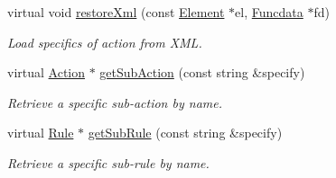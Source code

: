 \begin{DoxyCompactItemize}
virtual void \mbox{\hyperlink{class_action_a80154d5741583712fc63e64c500ce205}{restore\+Xml}} (const \mbox{\hyperlink{class_element}{Element}} $\ast$el, \mbox{\hyperlink{class_funcdata}{Funcdata}} $\ast$fd)
\begin{DoxyCompactList}\small\item\em Load specifics of action from X\+ML. \end{DoxyCompactList}\item 
virtual \mbox{\hyperlink{class_action}{Action}} $\ast$ \mbox{\hyperlink{class_action_ad7c260f28ff9705265558c3c077b9792}{get\+Sub\+Action}} (const string \&specify)
\begin{DoxyCompactList}\small\item\em Retrieve a specific sub-\/action by name. \end{DoxyCompactList}\item 
virtual \mbox{\hyperlink{class_rule}{Rule}} $\ast$ \mbox{\hyperlink{class_action_aacd1f960b27f1b02d27a49aaa61c895a}{get\+Sub\+Rule}} (const string \&specify)
\begin{DoxyCompactList}\small\item\em Retrieve a specific sub-\/rule by name. \end{DoxyCompactList}\end{DoxyCompactItemize}
